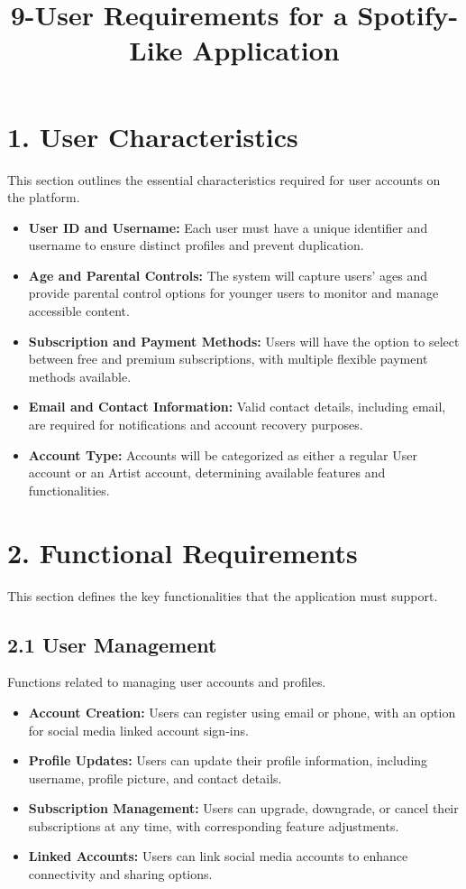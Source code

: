 \documentclass[a4paper,10pt]{article}
\title{9-User Requirements for a Spotify-Like Application}
\date{}
\begin{document}
\maketitle

\section*{1. User Characteristics}
This section outlines the essential characteristics required for user accounts on the platform.

\begin{itemize}[leftmargin=*]
    \item \textbf{User ID and Username:} Each user must have a unique identifier and username to ensure distinct profiles and prevent duplication.
    \item \textbf{Age and Parental Controls:} The system will capture users’ ages and provide parental control options for younger users to monitor and manage accessible content.
    \item \textbf{Subscription and Payment Methods:} Users will have the option to select between free and premium subscriptions, with multiple flexible payment methods available.
    \item \textbf{Email and Contact Information:} Valid contact details, including email, are required for notifications and account recovery purposes.
    \item \textbf{Account Type:} Accounts will be categorized as either a regular User account or an Artist account, determining available features and functionalities.
\end{itemize}

\section*{2. Functional Requirements}
This section defines the key functionalities that the application must support.

\subsection*{2.1 User Management}
Functions related to managing user accounts and profiles.

\begin{itemize}[leftmargin=*]
    \item \textbf{Account Creation:} Users can register using email or phone, with an option for social media linked account sign-ins.
    \item \textbf{Profile Updates:} Users can update their profile information, including username, profile picture, and contact details.
    \item \textbf{Subscription Management:} Users can upgrade, downgrade, or cancel their subscriptions at any time, with corresponding feature adjustments.
    \item \textbf{Linked Accounts:} Users can link social media accounts to enhance connectivity and sharing options.
\end{itemize}
\end{document}
